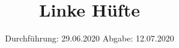 

\subject{TPS Praktikum}
\title{Linke Hüfte}
\date{%
	Durchführung: 29.06.2020
	\hspace{3em}
	Abgabe: 12.07.2020
}



	\maketitle
	\thispagestyle{empty}
	\tableofcontents
	\newpage
	\setlength{\parindent}{0em}
	
	

	\newpage
	\printbibliography{}
	\nocite{*}
	
	

